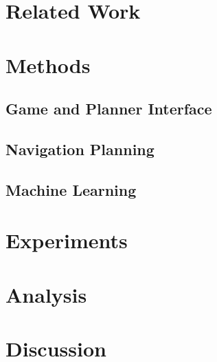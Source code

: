 \documentclass[10pt,final,conference]{IEEEtran}
\begin{document}
\section{Related Work}


\section{Methods}

\subsection{Game and Planner Interface}


\subsection{Navigation Planning}

\subsection{Machine Learning}


\section{Experiments}


\section{Analysis}


\section{Discussion}




\end{document}
